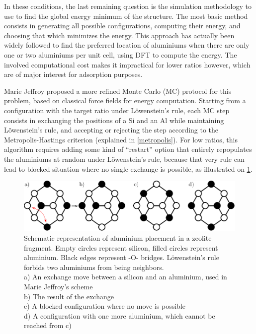 \documentclass[main.tex]{subfiles}
\begin{document}
In these conditions, the last remaining question is the simulation methodology to use to find the global energy minimum of the structure. The most basic method consists in generating all possible configurations, computing their energy, and choosing that which minimizes the energy. This approach has actually been widely followed to find the preferred location of aluminiums when there are only one or two aluminiums per unit cell, using DFT to compute the energy\autocite{AlDistributionThermodynamic,AlDistributionFAUDFT}. The involved computational cost makes it impractical for lower \SiAl ratios however, which are of major interest for adsorption purposes.

Marie Jeffroy \cite{Jeffroy}\label{mariejeffroy_al} proposed a more refined Monte Carlo (MC) protocol for this problem, based on classical force fields for energy computation. Starting from a configuration with the target \SiAl ratio under L\"owenstein's rule, each MC step consists in exchanging the positions of a Si and an Al while maintaining L\"owenstein's rule, and accepting or rejecting the step according to the Metropolis-Hastings criterion (explained in \cref{metropolis}). For low \SiAl ratios, this algorithm requires adding some kind of ``restart'' option that entirely repopulates the aluminiums at random under L\"owenstein's rule, because that very rule can lead to blocked situation where no single \SiAl exchange is possible, as illustrated on \cref{fig:blocked_situation}.

\begin{figure}
	\centering
	\includegraphics[width=\columnwidth]{figures/cations/blocked_situation.pdf}
	\caption{Schematic representation of aluminium placement in a zeolite fragment. Empty circles represent silicon, filled circles represent aluminium. Black edges represent -O- bridges. L\"owenstein's rule forbids two aluminiums from being neighbors.\\a) An exchange move between a silicon and an aluminium, used in Marie Jeffroy's scheme\autocite{Jeffroy}\\b) The result of the exchange\\c) A blocked configuration where no move is possible\\d) A configuration with one more aluminium, which cannot be reached from c)}\label{fig:blocked_situation}
\end{figure}
\end{document}
